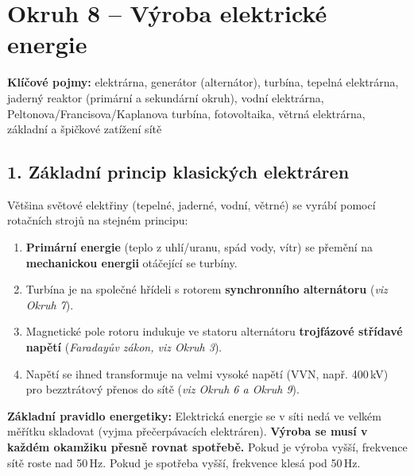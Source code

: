\documentclass[a4paper,10pt]{article}
\begin{document}
\section*{\large Okruh 8 – Výroba elektrické energie}

\begin{pojmybox}
\textbf{Klíčové pojmy:}
elektrárna, generátor (alternátor), turbína, tepelná elektrárna, jaderný reaktor (primární a sekundární okruh), vodní elektrárna, Peltonova/Francisova/Kaplanova turbína, fotovoltaika, větrná elektrárna, základní a špičkové zatížení sítě
\end{pojmybox}

\begin{vysvetlenibox}

\subsection*{1. Základní princip klasických elektráren}

Většina světové elektřiny (tepelné, jaderné, vodní, větrné) se vyrábí pomocí rotačních strojů na stejném principu:
\begin{enumerate}
  \item \textbf{Primární energie} (teplo z uhlí/uranu, spád vody, vítr) se přemění na \textbf{mechanickou energii} otáčející se turbíny.
  \item Turbína je na společné hřídeli s rotorem \textbf{synchronního alternátoru} (\textit{viz Okruh 7}).
  \item Magnetické pole rotoru indukuje ve statoru alternátoru \textbf{trojfázové střídavé napětí} (\textit{Faradayův zákon, viz Okruh 3}).
  \item Napětí se ihned transformuje na velmi vysoké napětí (VVN, např. 400\,kV) pro bezztrátový přenos do sítě (\textit{viz Okruh 6 a Okruh 9}).
\end{enumerate}

\begin{durazbox}
\textbf{Základní pravidlo energetiky:} Elektrická energie se v síti nedá ve velkém měřítku skladovat (vyjma přečerpávacích elektráren). \textbf{Výroba se musí v každém okamžiku přesně rovnat spotřebě.} Pokud je výroba vyšší, frekvence sítě roste nad 50\,Hz. Pokud je spotřeba vyšší, frekvence klesá pod 50\,Hz.
\end{durazbox}


\end{vysvetlenibox}
\end{document}
